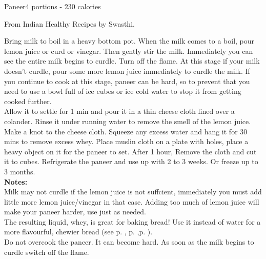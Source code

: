 \begin{recipe}{Paneer}{4 portions - 230 calories}{}

    \freeform From Indian Healthy Recipes by Swasthi.


    Bring milk to boil in a heavy bottom pot. When the milk comes to a boil, pour lemon juice or curd or vinegar. Then gently stir the milk. Immediately you can see the entire milk begins to curdle. Turn off the flame. At this stage if your milk doesn't curdle, pour some more lemon juice immediately to curdle the milk. If you continue to cook at this stage, paneer can be hard, so to prevent that you need to use a bowl full of ice cubes or ice cold water to stop it from getting cooked further.\\

    Allow it to settle for 1 min and pour it in a thin cheese cloth lined over a colander. Rinse it under running water to remove the smell of the lemon juice.\\

    Make a knot to the cheese cloth. Squeeze any excess water and hang it for 30 mins to remove excess whey. Place muslin cloth on a plate with holes, place a heavy object on it for the paneer to set. After 1 hour, Remove the cloth and cut it to cubes. Refrigerate the paneer and use up with 2 to 3 weeks. Or freeze up to 3 months.\\

    \textbf{Notes:}\\

    Milk may not curdle if the lemon juice is not suffcient, immediately you must add little more lemon juice/vinegar in that case. Adding too much of lemon juice will make your paneer harder, use just as needed.\\

    The resulting liquid, whey, is great for baking bread! Use it instead of water for a more flavourful, chewier bread (see p. \pageref{bread:noknead}, p. \pageref{bread:focaccia},p. \pageref{components:pizza_dough}).\\

    Do not overcook the paneer. It can become hard. As soon as the milk begins to curdle switch off the flame.

\end{recipe}